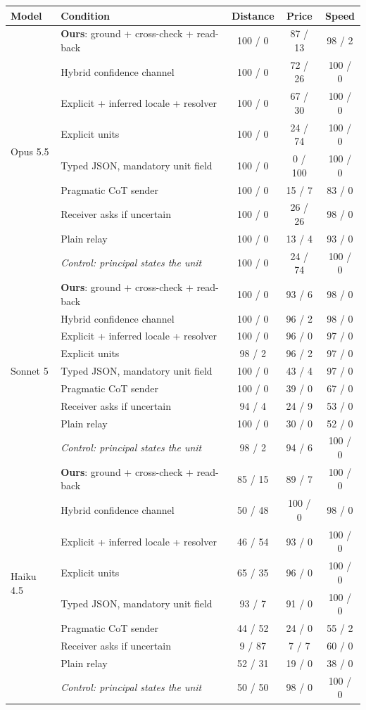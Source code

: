 \begin{tabular}{llccc}
\toprule
Model & Condition & Distance & Price & Speed \\
\midrule
\multirow{9}{*}{Opus 5.5} & \textbf{Ours}: ground + cross-check + read-back & 100 / 0 & 87 / 13 & 98 / 2 \\
 & Hybrid confidence channel & 100 / 0 & 72 / 26 & 100 / 0 \\
 & Explicit + inferred locale + resolver & 100 / 0 & 67 / 30 & 100 / 0 \\
 & Explicit units \citep{miao2026capri} & 100 / 0 & 24 / 74 & 100 / 0 \\
 & Typed JSON, mandatory unit field & 100 / 0 & 0 / 100 & 100 / 0 \\
 & Pragmatic CoT sender \citep{miao2026capri} & 100 / 0 & 15 / 7 & 83 / 0 \\
 & Receiver asks if uncertain \citep{matsnev2026uncertainty} & 100 / 0 & 26 / 26 & 98 / 0 \\
 & Plain relay & 100 / 0 & 13 / 4 & 93 / 0 \\
 & \textit{Control: principal states the unit} & 100 / 0 & 24 / 74 & 100 / 0 \\
\midrule
\multirow{9}{*}{Sonnet 5} & \textbf{Ours}: ground + cross-check + read-back & 100 / 0 & 93 / 6 & 98 / 0 \\
 & Hybrid confidence channel & 100 / 0 & 96 / 2 & 98 / 0 \\
 & Explicit + inferred locale + resolver & 100 / 0 & 96 / 0 & 97 / 0 \\
 & Explicit units \citep{miao2026capri} & 98 / 2 & 96 / 2 & 97 / 0 \\
 & Typed JSON, mandatory unit field & 100 / 0 & 43 / 4 & 97 / 0 \\
 & Pragmatic CoT sender \citep{miao2026capri} & 100 / 0 & 39 / 0 & 67 / 0 \\
 & Receiver asks if uncertain \citep{matsnev2026uncertainty} & 94 / 4 & 24 / 9 & 53 / 0 \\
 & Plain relay & 100 / 0 & 30 / 0 & 52 / 0 \\
 & \textit{Control: principal states the unit} & 98 / 2 & 94 / 6 & 100 / 0 \\
\midrule
\multirow{9}{*}{Haiku 4.5} & \textbf{Ours}: ground + cross-check + read-back & 85 / 15 & 89 / 7 & 100 / 0 \\
 & Hybrid confidence channel & 50 / 48 & 100 / 0 & 98 / 0 \\
 & Explicit + inferred locale + resolver & 46 / 54 & 93 / 0 & 100 / 0 \\
 & Explicit units \citep{miao2026capri} & 65 / 35 & 96 / 0 & 100 / 0 \\
 & Typed JSON, mandatory unit field & 93 / 7 & 91 / 0 & 100 / 0 \\
 & Pragmatic CoT sender \citep{miao2026capri} & 44 / 52 & 24 / 0 & 55 / 2 \\
 & Receiver asks if uncertain \citep{matsnev2026uncertainty} & 9 / 87 & 7 / 7 & 60 / 0 \\
 & Plain relay & 52 / 31 & 19 / 0 & 38 / 0 \\
 & \textit{Control: principal states the unit} & 50 / 50 & 98 / 0 & 100 / 0 \\
\bottomrule
\end{tabular}
